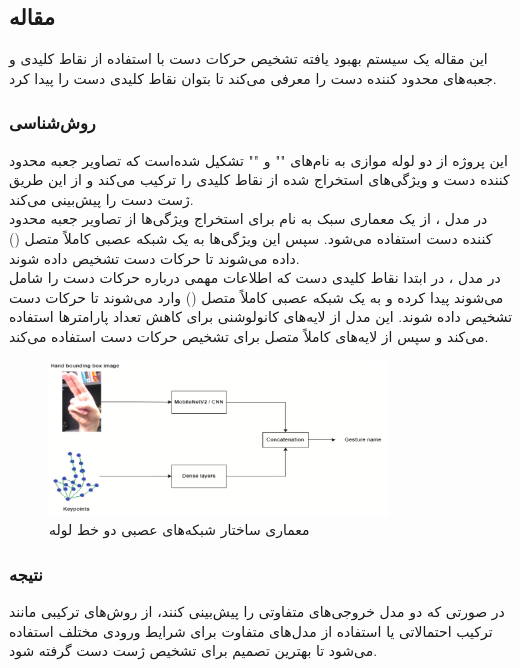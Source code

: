 \subsection{مقاله }
این مقاله یک سیستم بهبود یافته تشخیص حرکات دست با استفاده از نقاط کلیدی و جعبه‌های محدود کننده دست را معرفی می‌کند تا بتوان نقاط کلیدی دست را پیدا کرد.


\subsubsection{روش‌شناسی}
این پروژه از دو لوله موازی به نام‌های "" و "" تشکیل شده‌است که تصاویر جعبه 
محدود کننده دست و ویژگی‌های استخراج شده از نقاط کلیدی را ترکیب می‌کند و از این طریق ژست دست را پیش‌بینی می‌کند. 
\\
در مدل ، از یک معماری سبک به نام  برای استخراج ویژگی‌ها از تصاویر جعبه 
محدود کننده دست استفاده می‌شود. سپس این ویژگی‌ها به یک شبکه عصبی کاملاً متصل () داده می‌شوند تا حرکات دست تشخیص داده شوند.
\\
در مدل  ، در ابتدا نقاط کلیدی دست  که اطلاعات مهمی درباره حرکات دست را شامل می‌شوند پیدا کرده و به یک شبکه عصبی کاملاً متصل () وارد می‌شوند تا حرکات دست
تشخیص داده شوند. این مدل از لایه‌های کانولوشنی برای کاهش تعداد پارامترها استفاده می‌کند و سپس از لایه‌های کاملاً متصل برای تشخیص حرکات دست استفاده می‌کند.

\begin{figure}[h]
    \centering
    \includegraphics[width=0.8\textwidth]{keypoints_boundingBox.png}
    \caption{معماری ساختار شبکه‌های عصبی دو خط لوله}
\end{figure}


\subsubsection{نتیجه}
در صورتی که دو مدل خروجی‌های متفاوتی را پیش‌بینی کنند، از روش‌های ترکیبی مانند ترکیب احتمالاتی یا استفاده از مدل‌های متفاوت برای شرایط ورودی مختلف استفاده می‌شود تا بهترین تصمیم برای تشخیص ژست دست گرفته شود.




